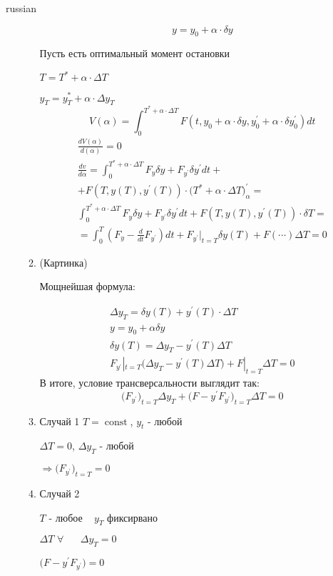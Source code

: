 \documentclass{article}
\begin{document}
\begin{otherlanguage*}{russian}
\begin{enumerate}
\begin{enumerate}
\begin{equation}
y = y_0 + \alpha \cdot \delta y 
\end{equation}

Пусть есть оптимальный момент остановки

$ T = T^* + \alpha \cdot \Delta T $

$ y_T = y_T^* + \alpha \cdot \Delta y_T$   
\begin{equation} 
V(\alpha) = \int_0^{T^* + \alpha \cdot \Delta T} F(t, y_0 + \alpha \cdot \delta y, y^{'}_0 + \alpha \cdot \delta y^{'}_0 ) dt    
\end{equation}
\begin{align}
\frac{d V(\alpha)}{d(\alpha)} = 0 \\ 
\frac{dv }{d\alpha} = \int_0^{T^* + \alpha \cdot \Delta T } F_y \delta y + F_{y^{'}} \delta y^{'} dt  + \\ +  F (T, y(T), y^{'}(T)) \cdot \Big(T^* + \alpha \cdot \Delta T \Big)^{'}_{\alpha} = \\
\int_0^{T^* + \alpha \cdot \Delta T } F_y \delta y + F_{y^{'}} \delta y^{'} dt  + F (T, y(T), y^{'}(T)) \cdot \delta T = \\  =  \int_0^T (F_y - \frac{d}{dt} F_{y^{'}}) dt  + F_{y^{'}}|_{t = T} \delta y (T) + F (\cdots ) \Delta T = 0 
\end{align}

\item (Картинка) 

Мощнейшая формула:
 
\begin{align}
\Delta y_T = \delta y (T) + y^{'} (T) \cdot \Delta T \\ y = y_0 + \alpha \delta y \\
\delta y (T) = \Delta y_T  - y^{'} (T) \Delta T \\
F_{y^{'}}|_{t=T} \Big( \Delta y_T - y^{'} (T) \Delta T \Big) + F|_{t = T} \Delta T = 0 
\end{align}
В итоге, условие трансверсальности выглядит так: 
\begin{equation}
\Big( F_{y^{'}} \Big)_{t = T}  \Delta y_T + \Big( F - y^{'} F_{y^{'}} \Big)_{t = T} \Delta T = 0  
\end{equation}
\item Случай 1 
$ T = \operatorname{const} $, $ y_t $ - любой 

$ \Delta T = 0 $, $ \Delta y_T $ - любой 

$ \Rightarrow \Big( F_{y^{'}} \Big)_{t = T} = 0 $

\item Случай 2 

$ T $ - любое $\,\,\,\,\,  y_T $ фиксирвано

$\Delta T \,\, \forall \,\,\,\,\, \,\,\,\,\,\Delta y_T = 0 $ 

$ \Big( F - y^{'} F_{y^{'}} \Big) = 0 $ 
\end{enumerate}
\end{enumerate}
\end{otherlanguage*} 
\end{document}
